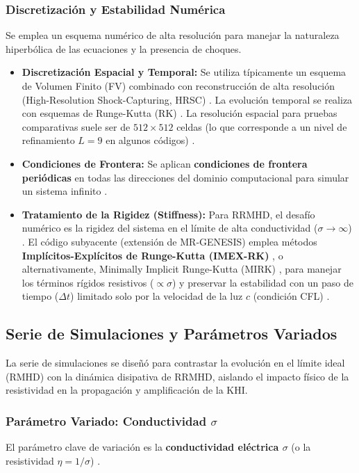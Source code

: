 \subsubsection{Discretización y Estabilidad Numérica}
Se emplea un esquema numérico de alta resolución para manejar la naturaleza hiperbólica de las ecuaciones y la presencia de choques.

\begin{itemize}
    \item \textbf{Discretización Espacial y Temporal:} Se utiliza típicamente un esquema de Volumen Finito (FV) combinado con reconstrucción de alta resolución (High-Resolution Shock-Capturing, HRSC) \cite{394}. La evolución temporal se realiza con esquemas de Runge-Kutta (RK) \cite{394, 273}. La resolución espacial para pruebas comparativas suele ser de $512 \times 512$ celdas (lo que corresponde a un nivel de refinamiento $L=9$ en algunos códigos) \cite{346}.
    \item \textbf{Condiciones de Frontera:} Se aplican \textbf{condiciones de frontera periódicas} en todas las direcciones del dominio computacional para simular un sistema infinito \cite{347}.
    \item \textbf{Tratamiento de la Rigidez (Stiffness):} Para RRMHD, el desafío numérico es la rigidez del sistema en el límite de alta conductividad ($\sigma \to \infty$) \cite{336, 371}. El código subyacente (extensión de MR-GENESIS) emplea métodos \textbf{Implícitos-Explícitos de Runge-Kutta (IMEX-RK)} \cite{335, 362, 420}, o alternativamente, Minimally Implicit Runge-Kutta (MIRK) \cite{420}, para manejar los términos rígidos resistivos ($\propto \sigma$) y preservar la estabilidad con un paso de tiempo ($\Delta t$) limitado solo por la velocidad de la luz $c$ (condición CFL) \cite{372, 374, 423}.
\end{itemize}

\subsection{Serie de Simulaciones y Parámetros Variados}

La serie de simulaciones se diseñó para contrastar la evolución en el límite ideal (RMHD) con la dinámica disipativa de RRMHD, aislando el impacto físico de la resistividad en la propagación y amplificación de la KHI.

\subsubsection{Parámetro Variado: Conductividad $\sigma$}
El parámetro clave de variación es la \textbf{conductividad eléctrica $\sigma$} (o la resistividad $\eta = 1/\sigma$) \cite{391, 362}.

